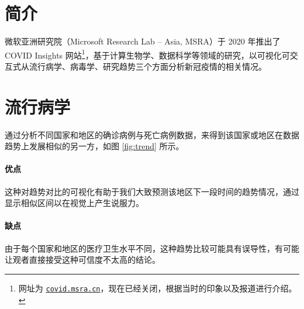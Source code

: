 

    \section{简介}
    
    微软亚洲研究院（Microsoft Research Lab -- Asia, MSRA）于 2020 年推出了 COVID Insights 网站\footnote{网址为 \href{https://covid.msra.cn}{\texttt{covid.msra.cn}}，现在已经关闭，根据当时的印象以及报道\cite{msracn}进行介绍。}，基于计算生物学、数据科学等领域的研究，以可视化可交互式从流行病学、病毒学、研究趋势三个方面分析新冠疫情的相关情况。
    
    \section{流行病学}

    通过分析不同国家和地区的确诊病例与死亡病例数据，来得到该国家或地区在数据趋势上发展相似的另一方，如图 \ref{fig:trend} 所示。

    \paragraph{优点} 这种对趋势对比的可视化有助于我们大致预测该地区下一段时间的趋势情况，通过显示相似区间以在视觉上产生说服力。

    \paragraph{缺点} 由于每个国家和地区的医疗卫生水平不同，这种趋势比较可能具有误导性，有可能让观者直接接受这种可信度不太高的结论。

